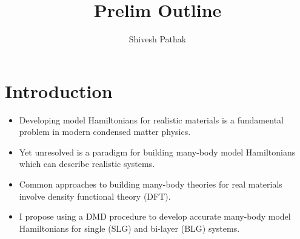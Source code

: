 \documentclass{article}
\title{Prelim Outline}
\author{Shivesh Pathak}
\begin{document}
\section{Introduction}
\begin{itemize}
\item Developing model Hamiltonians for realistic materials is a fundamental problem in modern condensed matter physics.

\item Yet unresolved is a paradigm for building many-body model Hamiltonians which can describe realistic systems.

\item Common approaches to building many-body theories for real materials involve density functional theory (DFT).

\item I propose using a DMD procedure to develop accurate many-body model Hamiltonians for single (SLG) and bi-layer (BLG) systems.
\end{itemize}
\end{document}
